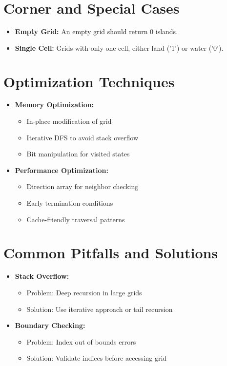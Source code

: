 \section*{Corner and Special Cases}
\begin{itemize}
    \item \textbf{Empty Grid:} An empty grid should return 0 islands.
    
    \item \textbf{Single Cell:} Grids with only one cell, either land ('1') or water ('0').
    
\end{itemize}

\section*{Optimization Techniques}
\begin{itemize}
    \item \textbf{Memory Optimization:}
        \begin{itemize}
            \item In-place modification of grid
            \item Iterative DFS to avoid stack overflow
            \item Bit manipulation for visited states
        \end{itemize}
    
    \item \textbf{Performance Optimization:}
        \begin{itemize}
            \item Direction array for neighbor checking
            \item Early termination conditions
            \item Cache-friendly traversal patterns
        \end{itemize}
\end{itemize}

\section*{Common Pitfalls and Solutions}
\begin{itemize}
    \item \textbf{Stack Overflow:}
        \begin{itemize}
            \item Problem: Deep recursion in large grids
            \item Solution: Use iterative approach or tail recursion
        \end{itemize}
    
    \item \textbf{Boundary Checking:}
        \begin{itemize}
            \item Problem: Index out of bounds errors
            \item Solution: Validate indices before accessing grid
        \end{itemize}
\end{itemize}

\printindex